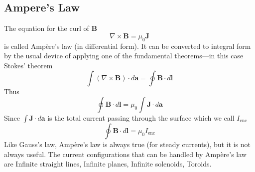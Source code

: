 \documentclass[../../../main.tex]{subfiles}
\begin{document}
\subsection{Ampere's Law}
The equation for the curl of \textbf{B}
\begin{equation*}
    \nabla\times \mathbf{B}=\mu_0 \mathbf{J}
\end{equation*}
is called Ampère’s law (in differential form). It can be converted to integral form by the usual device of applying one of the fundamental theorems—in this case Stokes’ theorem
\begin{equation*}
    \int(\nabla\times \mathbf{B})\cdot d\mathbf{a}=\oint \mathbf{B}\cdot d\mathbf{l}
\end{equation*}
Thus
\begin{equation*}
    \oint \mathbf{B}\cdot d\mathbf{l}=\mu_0\int\mathbf{J} \cdot d\mathbf{a}
\end{equation*}
Since $\int\mathbf{J} \cdot d\mathbf{a}$ is the total current passing through the surface which we call $I_{\text{enc}}$
\begin{equation*}
    \oint \mathbf{B}\cdot d\mathbf{l}=\mu_0I_{\text{enc}}
\end{equation*}
Like Gauss’s law, Ampère’s law is always true (for steady currents), but it is not always useful. The current configurations that can be handled by Ampère’s law are Infinite straight lines, Infinite planes, Infinite solenoids, Toroids.
\end{document}
